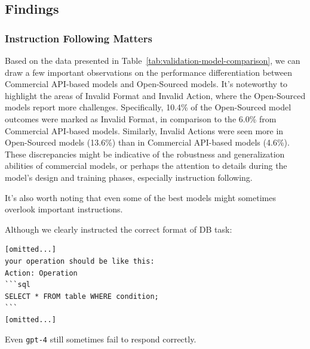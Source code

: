 \subsection{Findings}
\label{app:case_study}

\subsubsection{Instruction Following Matters}
\label{app:instruction_matters}
Based on the data presented in Table~\ref{tab:validation-model-comparison}, we can draw a few important observations on the performance differentiation between Commercial API-based models and Open-Sourced models.
It's noteworthy to highlight the areas of Invalid Format and Invalid Action, where the Open-Sourced models report more challenges. Specifically, 10.4\% of the Open-Sourced model outcomes were marked as Invalid Format, in comparison to the 6.0\% from Commercial API-based models. Similarly, Invalid Actions were seen more in Open-Sourced models (13.6\%) than in Commercial API-based models (4.6\%). These discrepancies might be indicative of the robustness and generalization abilities of commercial models, or perhaps the attention to details during the model's design and training phases, especially instruction following.

\begin{table}[h]
\centering
{}
\caption{Comparison of Outcome distribution for 2 types of models.}
\label{tab:validation-model-comparison}
\end{table}

It's also worth noting that even some of the best models might sometimes overlook important instructions. 

Although we clearly instructed the correct format of DB task:
\begin{lstlisting}
[omitted...]
your operation should be like this:
Action: Operation
```sql
SELECT * FROM table WHERE condition;
```
[omitted...]
\end{lstlisting}
Even \texttt{gpt-4} still sometimes fail to respond correctly.


